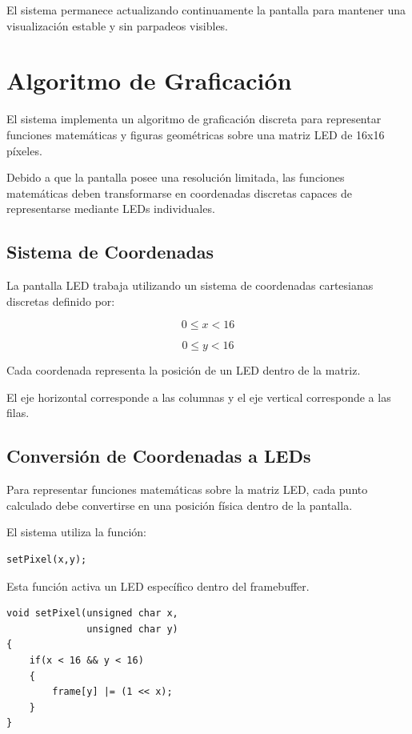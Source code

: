 El sistema permanece actualizando continuamente la pantalla para mantener una visualización estable y sin parpadeos visibles.

\section{Algoritmo de Graficación}

El sistema implementa un algoritmo de graficación discreta para representar funciones matemáticas y figuras geométricas sobre una matriz LED de 16x16 píxeles.

Debido a que la pantalla posee una resolución limitada, las funciones matemáticas deben transformarse en coordenadas discretas capaces de representarse mediante LEDs individuales.

\subsection{Sistema de Coordenadas}

La pantalla LED trabaja utilizando un sistema de coordenadas cartesianas discretas definido por:

\[
0 \leq x < 16
\]

\[
0 \leq y < 16
\]

Cada coordenada representa la posición de un LED dentro de la matriz.

El eje horizontal corresponde a las columnas y el eje vertical corresponde a las filas.

\subsection{Conversión de Coordenadas a LEDs}

Para representar funciones matemáticas sobre la matriz LED, cada punto calculado debe convertirse en una posición física dentro de la pantalla.

El sistema utiliza la función:

\begin{verbatim}
setPixel(x,y);
\end{verbatim}

Esta función activa un LED específico dentro del framebuffer.

\begin{verbatim}
void setPixel(unsigned char x,
              unsigned char y)
{
    if(x < 16 && y < 16)
    {
        frame[y] |= (1 << x);
    }
}
\end{verbatim}

